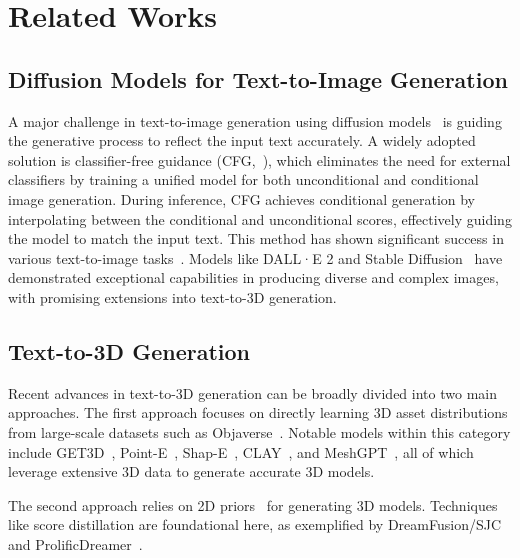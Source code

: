 \section{Related Works}

\subsection{Diffusion Models for Text-to-Image Generation}
A major challenge in text-to-image generation using diffusion models~\citep{yu2024beyond, liu2024drag, xu2024dreamanime} is guiding the generative process to reflect the input text accurately. A widely adopted solution is classifier-free guidance (CFG,~\cite{ho2022classifier}), which eliminates the need for external classifiers by training a unified model for both unconditional and conditional image generation. During inference, CFG achieves conditional generation by interpolating between the conditional and unconditional scores, effectively guiding the model to match the input text. This method has shown significant success in various text-to-image tasks~\citep{balaji2022ediff, nichol2021glide, ramesh2022hierarchical}. Models like DALL·E 2 and Stable Diffusion~\citep{rombach2022high} have demonstrated exceptional capabilities in producing diverse and complex images, with promising extensions into text-to-3D generation.

\subsection{Text-to-3D Generation}
Recent advances in text-to-3D generation can be broadly divided into two main approaches. The first approach focuses on directly learning 3D asset distributions from large-scale datasets such as Objaverse~\citep{deitke2023objaverse}. Notable models within this category include GET3D~\citep{gao2022get3d}, Point-E~\citep{nichol2022point}, Shap-E~\citep{jun2023shap}, CLAY~\citep{zhang2024clay}, and MeshGPT~\citep{siddiqui2024meshgpt}, all of which leverage extensive 3D data to generate accurate 3D models.

The second approach relies on 2D priors~\citep{jiang2023diffuse3d} for generating 3D models. Techniques like score distillation are foundational here, as exemplified by DreamFusion/SJC~\citep{poole2022dreamfusion, wang2023score} and ProlificDreamer~\citep{wang2024prolificdreamer}.


